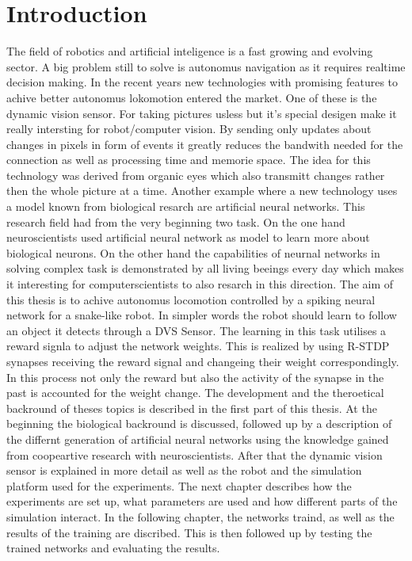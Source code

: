 
\chapter{Introduction}\label{chapter:introduction}
The field of robotics and artificial inteligence is a fast growing and evolving sector. 
A big problem still to solve is autonomus navigation as it requires realtime decision making. In the recent years new technologies with promising features to achive better autonomus lokomotion entered the market. One of these is the dynamic vision sensor. For taking pictures usless but it's special desigen make it really intersting for robot/computer vision. By sending only updates about changes in pixels in form of events it greatly reduces the bandwith needed for the connection as well as processing time and memorie space. The idea for this technology was derived from organic eyes which also transmitt changes rather then the whole picture at a time.
\newline
Another example where a new technology uses a model known from biological resarch are artificial neural networks. This research field had from the very beginning two task. On the one hand neuroscientists used artificial neural network as model to learn more about biological neurons. On the other hand the capabilities of neurnal networks in solving complex task is demonstrated by all living beeings every day which makes it interesting for computerscientists to also resarch in this direction.
The aim of this thesis is to achive autonomus locomotion controlled by a spiking neural network for a snake-like robot. In simpler words the robot should learn to follow an object it detects through a DVS Sensor. The learning in this task utilises a reward signla to adjust the network weights. This is realized by using R-STDP synapses receiving the reward signal and changeing their weight correspondingly. In this process not only the reward but also the activity of the synapse in the past is accounted for the weight change.
The development and the theroetical backround of theses topics is described in the first part of this thesis. At the beginning the biological backround is discussed, followed up by a description of the differnt generation of artificial neural networks using the knowledge gained from coopeartive research with neuroscientists. After that the dynamic vision sensor is explained in more detail as well as the robot and the simulation platform used for the experiments. The next chapter describes how the experiments are set up, what parameters are used and how different parts of the simulation interact.
In the following chapter, the networks traind, as well as the results of the training are 
discribed. This is then followed up by testing the trained networks and evaluating the results.